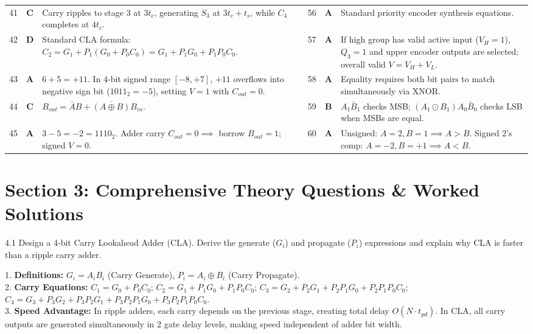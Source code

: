 \begin{table}[htbp]
\begin{tabularx}{\textwidth}{l c X l c X}
41 & \textbf{C} & Carry ripples to stage 3 at $3t_c$, generating $S_3$ at $3t_c+t_s$, while $C_4$ completes at $4t_c$. & 56 & \textbf{A} & Standard priority encoder synthesis equations. \\
42 & \textbf{D} & Standard CLA formula: $C_2 = G_1 + P_1(G_0 + P_0 C_0) = G_1 + P_1G_0 + P_1P_0C_0$. & 57 & \textbf{A} & If high group has valid active input ($V_H=1$), $Q_3=1$ and upper encoder outputs are selected; overall valid $V = V_H + V_L$. \\
43 & \textbf{A} & $6+5=+11$. In 4-bit signed range $[-8,+7]$, $+11$ overflows into negative sign bit ($1011_2 = -5$), setting $V=1$ with $C_{out}=0$. & 58 & \textbf{A} & Equality requires both bit pairs to match simultaneously via XNOR. \\
44 & \textbf{C} & $B_{out} = \bar{A}B + \overline{(A\oplus B)}B_{in}$. & 59 & \textbf{B} & $A_1\bar{B}_1$ checks MSB; $(A_1 \odot B_1)A_0\bar{B}_0$ checks LSB when MSBs are equal. \\
45 & \textbf{A} & $3 - 5 = -2 = 1110_2$. Adder carry $C_{out}=0 \implies$ borrow $B_{out}=1$; signed $V=0$. & 60 & \textbf{A} & Unsigned: $A=2, B=1 \implies A>B$. Signed 2's comp: $A=-2, B=+1 \implies A<B$. \\
\bottomrule
\end{tabularx}
\end{table}

\newpage
\section{Section 3: Comprehensive Theory Questions \& Worked Solutions}
\begin{theoryq}{4.1}
Design a 4-bit Carry Lookahead Adder (CLA). Derive the generate ($G_i$) and propagate ($P_i$) expressions and explain why CLA is faster than a ripple carry adder.
\end{theoryq}

\begin{theorysol}
1. \textbf{Definitions:} $G_i = A_i B_i$ (Carry Generate), $P_i = A_i \oplus B_i$ (Carry Propagate).\\
2. \textbf{Carry Equations:} $C_1 = G_0 + P_0 C_0$; $C_2 = G_1 + P_1 G_0 + P_1 P_0 C_0$; $C_3 = G_2 + P_2 G_1 + P_2 P_1 G_0 + P_2 P_1 P_0 C_0$; $C_4 = G_3 + P_3 G_2 + P_3 P_2 G_1 + P_3 P_2 P_1 G_0 + P_3 P_2 P_1 P_0 C_0$.\\
3. \textbf{Speed Advantage:} In ripple adders, each carry depends on the previous stage, creating total delay $O(N \cdot t_{pd})$. In CLA, all carry outputs are generated simultaneously in 2 gate delay levels, making speed independent of adder bit width.
\end{theorysol}

